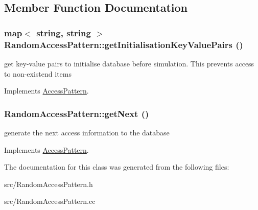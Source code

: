 \subsection{Member Function Documentation}
\hypertarget{classRandomAccessPattern_a72da825a9cb74f58fcadf6fc894d5e82}{
\subsubsection[{getInitialisationKeyValuePairs}]{\setlength{\rightskip}{0pt plus 5cm}map$<$ string, string $>$ RandomAccessPattern::getInitialisationKeyValuePairs ()}}
\label{classRandomAccessPattern_a72da825a9cb74f58fcadf6fc894d5e82}
get key-\/value pairs to initialise database before simulation. This prevents access to non-\/existend items 

Implements \hyperlink{classAccessPattern_afa72bed11401bfd96e8fa88acd72934b}{AccessPattern}.\hypertarget{classRandomAccessPattern_a5b590afc37a8bf5e4a4235834c6ebe12}{
\subsubsection[{getNext}]{ RandomAccessPattern::getNext ()}}
\label{classRandomAccessPattern_a5b590afc37a8bf5e4a4235834c6ebe12}
generate the next access information to the database 

Implements \hyperlink{classAccessPattern_a8c46aedb717e862598524f250f23086f}{AccessPattern}.

The documentation for this class was generated from the following files:\begin{DoxyCompactItemize}
\item 
src/RandomAccessPattern.h\item 
src/RandomAccessPattern.cc\end{DoxyCompactItemize}

